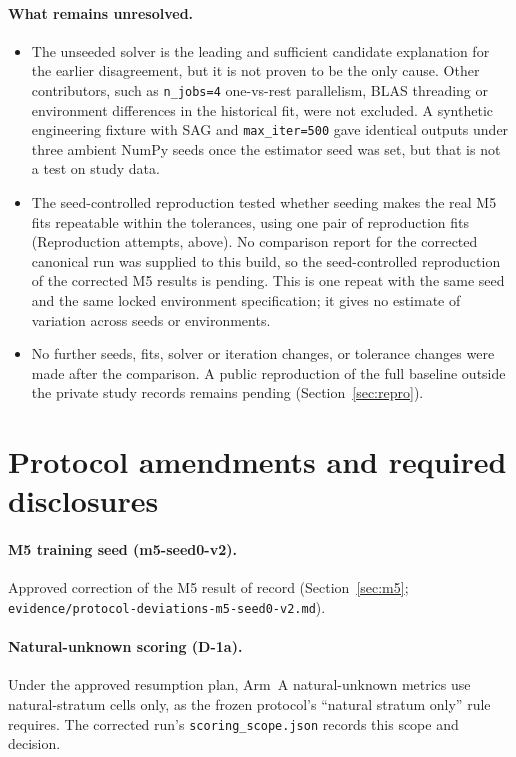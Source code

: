 \documentclass[11pt]{article}
\newcommand{\code}[1]{\texttt{#1}}
\newif\ifctreport
\newcommand{\Reprostatus}{\ifctreport A seed-controlled reproduction of the corrected M5 results was run and compared with the corrected canonical run by the repository's tiered comparison; that internal comparison reports overall status ``\ctres{comparison}{report}{overall}''. This is an internal tolerance comparison by the same pipeline, not independent verification\else No comparison report for the corrected canonical run was supplied to this build, so the seed-controlled reproduction of the corrected M5 results is pending\fi}
\begin{document}
\paragraph{What remains unresolved.}
\begin{itemize}
\item The unseeded solver is the leading and sufficient candidate explanation for the earlier disagreement, but it is not proven to be the only cause. Other contributors, such as \code{n\_jobs=4} one-vs-rest parallelism, BLAS threading or environment differences in the historical fit, were not excluded. A synthetic engineering fixture with SAG and \code{max\_iter=500} gave identical outputs under three ambient NumPy seeds once the estimator seed was set, but that is not a test on study data.
\item The seed-controlled reproduction tested whether seeding makes the real M5 fits repeatable within the tolerances, using one pair of reproduction fits (Reproduction attempts, above). \Reprostatus. This is one repeat with the same seed and the same locked environment specification; it gives no estimate of variation across seeds or environments.
\item No further seeds, fits, solver or iteration changes, or tolerance changes were made after the comparison. A public reproduction of the full baseline outside the private study records remains pending (Section~\ref{sec:repro}).
\end{itemize}

\section{Protocol amendments and required disclosures}\label{sec:amend}

\paragraph{M5 training seed (m5-seed0-v2).} Approved correction of the M5 result of record (Section~\ref{sec:m5}; \nolinkurl{evidence/protocol-deviations-m5-seed0-v2.md}).

\paragraph{Natural-unknown scoring (D-1a).} Under the approved resumption plan, Arm~A natural-unknown metrics use natural-stratum cells only, as the frozen protocol's ``natural stratum only'' rule requires. The corrected run's \nolinkurl{scoring_scope.json} records this scope and decision.
\end{document}
